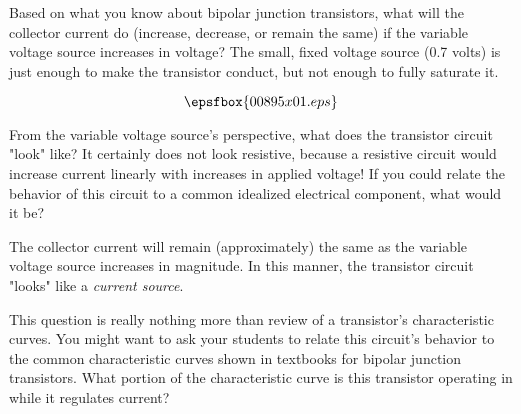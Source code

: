

Based on what you know about bipolar junction transistors, what will the collector current do (increase, decrease, or remain the same) if the variable voltage source increases in voltage?  The small, fixed voltage source (0.7 volts) is just enough to make the transistor conduct, but not enough to fully saturate it.

$$\epsfbox{00895x01.eps}$$

From the variable voltage source's perspective, what does the transistor circuit "look" like?  It certainly does not look resistive, because a resistive circuit would increase current linearly with increases in applied voltage!  If you could relate the behavior of this circuit to a common idealized electrical component, what would it be?







The collector current will remain (approximately) the same as the variable voltage source increases in magnitude.  In this manner, the transistor circuit "looks" like a {\it current source}.







This question is really nothing more than review of a transistor's characteristic curves.  You might want to ask your students to relate this circuit's behavior to the common characteristic curves shown in textbooks for bipolar junction transistors.  What portion of the characteristic curve is this transistor operating in while it regulates current?




